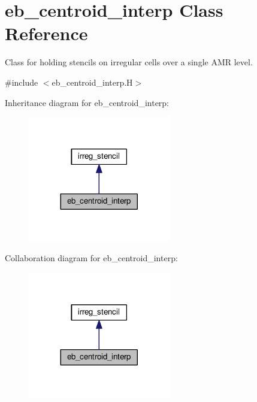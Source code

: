 \hypertarget{classeb__centroid__interp}{}\section{eb\+\_\+centroid\+\_\+interp Class Reference}
\label{classeb__centroid__interp}


Class for holding stencils on irregular cells over a single A\+MR level.  




{\ttfamily \#include $<$eb\+\_\+centroid\+\_\+interp.\+H$>$}



Inheritance diagram for eb\+\_\+centroid\+\_\+interp\+:\nopagebreak
\begin{figure}[H]
\begin{center}
\leavevmode
\includegraphics[width=176pt]{classeb__centroid__interp__inherit__graph}
\end{center}
\end{figure}


Collaboration diagram for eb\+\_\+centroid\+\_\+interp\+:\nopagebreak
\begin{figure}[H]
\begin{center}
\leavevmode
\includegraphics[width=176pt]{classeb__centroid__interp__coll__graph}
\end{center}
\end{figure}
